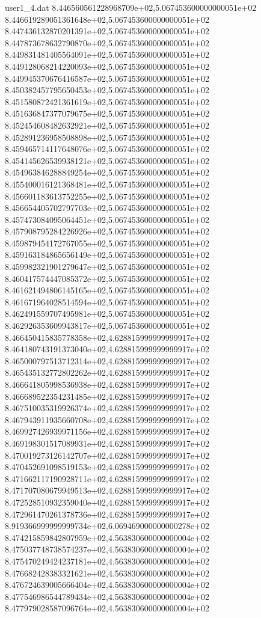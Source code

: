 \begin{filecontents}{user1_4.dat}
8.446560561228968709e+02,5.067453600000000051e+02
8.446619289051361648e+02,5.067453600000000051e+02
8.447436132870201391e+02,5.067453600000000051e+02
8.447873678632790870e+02,5.067453600000000051e+02
8.449831481405564091e+02,5.067453600000000051e+02
8.449128068214220093e+02,5.067453600000000051e+02
8.449945370676416587e+02,5.067453600000000051e+02
8.450382457795650453e+02,5.067453600000000051e+02
8.451580872421361619e+02,5.067453600000000051e+02
8.451636847377079675e+02,5.067453600000000051e+02
8.452454608482632921e+02,5.067453600000000051e+02
8.452891236958508898e+02,5.067453600000000051e+02
8.459465714117648076e+02,5.067453600000000051e+02
8.454145626539938121e+02,5.067453600000000051e+02
8.454963846288849254e+02,5.067453600000000051e+02
8.455400016121368481e+02,5.067453600000000051e+02
8.456601183613752255e+02,5.067453600000000051e+02
8.456654405702797703e+02,5.067453600000000051e+02
8.457473084095064451e+02,5.067453600000000051e+02
8.457908795284226926e+02,5.067453600000000051e+02
8.459879454172767055e+02,5.067453600000000051e+02
8.459163184865656149e+02,5.067453600000000051e+02
8.459982321901279647e+02,5.067453600000000051e+02
8.460417574447085372e+02,5.067453600000000051e+02
8.461621494806145165e+02,5.067453600000000051e+02
8.461671964028514594e+02,5.067453600000000051e+02
8.462491559707495981e+02,5.067453600000000051e+02
8.462926353609943817e+02,5.067453600000000051e+02
8.466450415835778358e+02,4.628815999999999917e+02
8.464180743191373040e+02,4.628815999999999917e+02
8.465000797513712314e+02,4.628815999999999917e+02
8.465435132772802262e+02,4.628815999999999917e+02
8.466641805998536938e+02,4.628815999999999917e+02
8.466689522354231485e+02,4.628815999999999917e+02
8.467510035319926374e+02,4.628815999999999917e+02
8.467943911935660708e+02,4.628815999999999917e+02
8.469927426939971156e+02,4.628815999999999917e+02
8.469198301517089931e+02,4.628815999999999917e+02
8.470019273126142707e+02,4.628815999999999917e+02
8.470452691098519153e+02,4.628815999999999917e+02
8.471662117190928711e+02,4.628815999999999917e+02
8.471707080679949513e+02,4.628815999999999917e+02
8.472528510932359040e+02,4.628815999999999917e+02
8.472961470261378736e+02,4.628815999999999917e+02
8.919366999999999734e+02,6.069469000000000278e+02
8.474215859842807959e+02,4.563830600000000004e+02
8.475037748738574237e+02,4.563830600000000004e+02
8.475470249424237181e+02,4.563830600000000004e+02
8.476682428383321621e+02,4.563830600000000004e+02
8.476724639005666404e+02,4.563830600000000004e+02
8.477546986544789434e+02,4.563830600000000004e+02
8.477979028587096764e+02,4.563830600000000004e+02

\end{filecontents}
